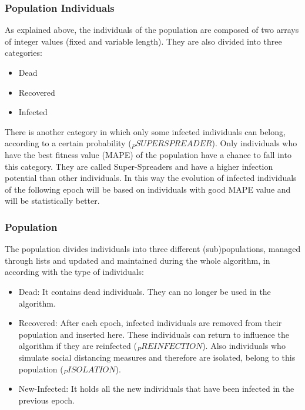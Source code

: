 \documentclass[letterpaper]{article}%
\begin{document}
\subsubsection{Population Individuals}
	As explained above, the individuals of the population are composed of two arrays of integer values (fixed and variable length). They are also divided into three categories:
\begin{itemize}
\item Dead
\item Recovered
\item Infected
\end{itemize}
There is another category in which only some infected individuals can belong, according to a certain probability ($_PSUPERSPREADER$). Only individuals who have the best fitness value (MAPE) of the population have a chance to fall into this category. They are called Super-Spreaders and have a higher infection potential than other individuals. In this way the evolution of infected individuals of the following epoch will be based on individuals with good MAPE value and will be statistically better.

\subsubsection{Population}
	The population divides individuals into three different (sub)populations, managed through lists and updated and maintained during the whole algorithm, in according with the type of individuals:
\begin{itemize}
\item Dead: It contains dead individuals. They can no longer be used in the algorithm.
\item Recovered: After each epoch, infected individuals are removed from their population and inserted here. These individuals can return to influence the algorithm if they are reinfected ($_PREINFECTION$). Also individuals who simulate social distancing measures and therefore are isolated, belong to this population ($_PISOLATION$).
\item New-Infected: It holds all the new individuals that have been infected in the previous epoch.
\end{itemize}
\end{document}
